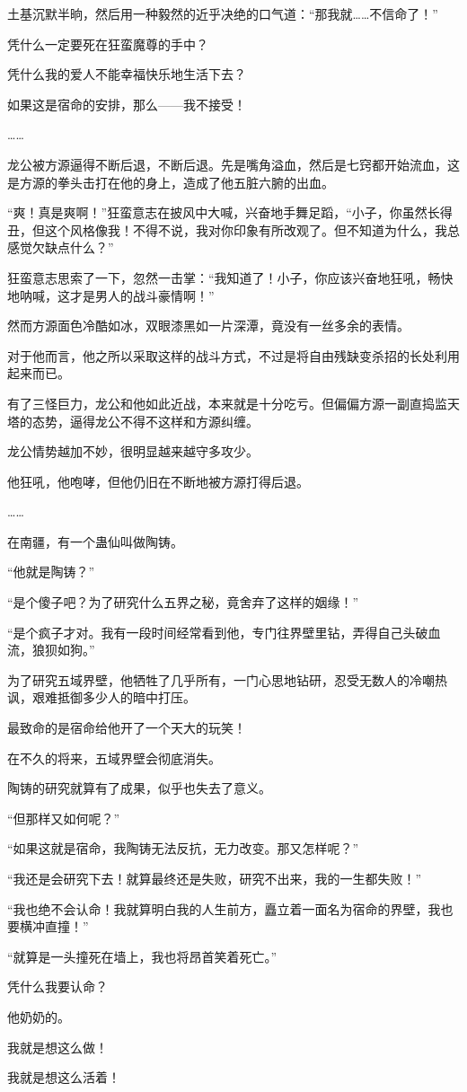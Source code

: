 \begin{this_body}
土基沉默半晌，然后用一种毅然的近乎决绝的口气道：“那我就……不信命了！”

凭什么一定要死在狂蛮魔尊的手中？

凭什么我的爱人不能幸福快乐地生活下去？

如果这是宿命的安排，那么——我不接受！

……

龙公被方源逼得不断后退，不断后退。先是嘴角溢血，然后是七窍都开始流血，这是方源的拳头击打在他的身上，造成了他五脏六腑的出血。

“爽！真是爽啊！”狂蛮意志在披风中大喊，兴奋地手舞足蹈，“小子，你虽然长得丑，但这个风格像我！不得不说，我对你印象有所改观了。但不知道为什么，我总感觉欠缺点什么？”

狂蛮意志思索了一下，忽然一击掌：“我知道了！小子，你应该兴奋地狂吼，畅快地呐喊，这才是男人的战斗豪情啊！”

然而方源面色冷酷如冰，双眼漆黑如一片深潭，竟没有一丝多余的表情。

对于他而言，他之所以采取这样的战斗方式，不过是将自由残缺变杀招的长处利用起来而已。

有了三怪巨力，龙公和他如此近战，本来就是十分吃亏。但偏偏方源一副直捣监天塔的态势，逼得龙公不得不这样和方源纠缠。

龙公情势越加不妙，很明显越来越守多攻少。

他狂吼，他咆哮，但他仍旧在不断地被方源打得后退。

……

在南疆，有一个蛊仙叫做陶铸。

“他就是陶铸？”

“是个傻子吧？为了研究什么五界之秘，竟舍弃了这样的姻缘！”

“是个疯子才对。我有一段时间经常看到他，专门往界壁里钻，弄得自己头破血流，狼狈如狗。”

为了研究五域界壁，他牺牲了几乎所有，一门心思地钻研，忍受无数人的冷嘲热讽，艰难抵御多少人的暗中打压。

最致命的是宿命给他开了一个天大的玩笑！

在不久的将来，五域界壁会彻底消失。

陶铸的研究就算有了成果，似乎也失去了意义。

“但那样又如何呢？”

“如果这就是宿命，我陶铸无法反抗，无力改变。那又怎样呢？”

“我还是会研究下去！就算最终还是失败，研究不出来，我的一生都失败！”

“我也绝不会认命！我就算明白我的人生前方，矗立着一面名为宿命的界壁，我也要横冲直撞！”

“就算是一头撞死在墙上，我也将昂首笑着死亡。”

凭什么我要认命？

他奶奶的。

我就是想这么做！

我就是想这么活着！

\end{this_body}

